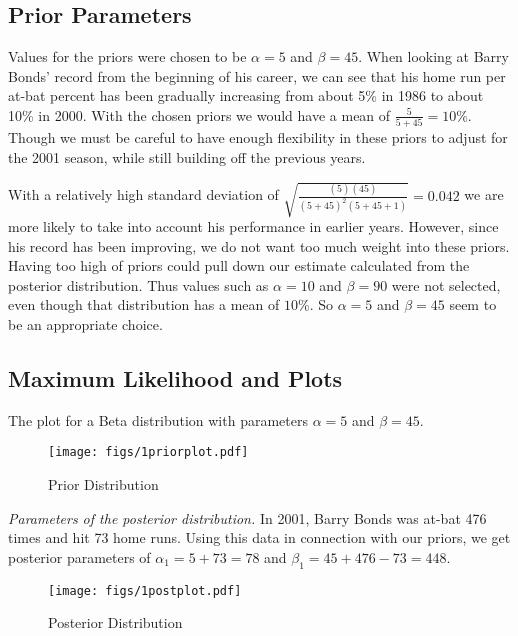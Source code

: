 \documentclass[12pt]{article}
\begin{document}
\subsection{Prior Parameters}

\noindent Values for the priors were chosen to be $\alpha=5$ and $\beta=45$.  When looking at Barry Bonds' record from the beginning of his career, we can see that his home run per at-bat percent has been gradually increasing from about 5\% in 1986 to about 10\% in 2000.  With the chosen priors we would have a mean of $\frac{5}{5+45}=10\%$.  Though we must be careful to have enough flexibility in these priors to adjust for the 2001 season, while still building off the previous years.
\bigskip

\noindent With a relatively high standard deviation of $\sqrt{\frac{(5)(45)}{(5+45)^2(5+45+1)}}=0.042$ we are more likely to take into account his performance in earlier years.  However, since his record has been improving, we do not want too much weight into these priors.  Having too high of priors could pull down our estimate calculated from the posterior distribution.  Thus values such as $\alpha=10$ and $\beta=90$ were not selected, even though that distribution has a mean of $10\%$.  So $\alpha=5$ and $\beta=45$ seem to be an appropriate choice.
\bigskip


\subsection{Maximum Likelihood and Plots}

\noindent The plot for a Beta distribution with parameters $\alpha=5$ and $\beta=45$.

\begin{figure}[H]
\begin{center}
\texttt{[image: figs/1priorplot.pdf]}
\caption{Prior Distribution}
\end{center}
\end{figure}
\bigskip
\bigskip
\bigskip

\noindent \textit{Parameters of the posterior distribution.}  In 2001, Barry Bonds was at-bat 476 times and hit 73 home runs.  Using this data in connection with our priors, we get posterior parameters of $\alpha_1=5+73=78$ and $\beta_1=45+476-73=448$.

\begin{figure}[H]
\begin{center}
\texttt{[image: figs/1postplot.pdf]}
\caption{Posterior Distribution}
\end{center}
\end{figure}
\end{document}
